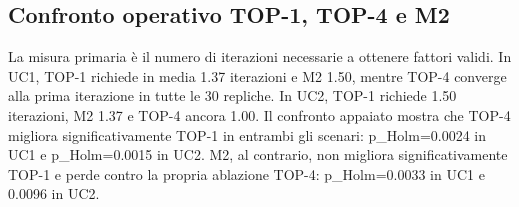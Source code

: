 \subsection{Confronto operativo TOP-1, TOP-4 e M2}\label{sec:finale_5_1_2}\label{sec:confronto}

La misura primaria è il numero di iterazioni necessarie a ottenere fattori validi. In UC1, TOP-1 richiede in media 1.37 iterazioni e M2 1.50, mentre TOP-4 converge alla prima iterazione in tutte le 30 repliche. In UC2, TOP-1 richiede 1.50 iterazioni, M2 1.37 e TOP-4 ancora 1.00. Il confronto appaiato mostra che TOP-4 migliora significativamente TOP-1 in entrambi gli scenari: p\_Holm=0.0024 in UC1 e p\_Holm=0.0015 in UC2. M2, al contrario, non migliora significativamente TOP-1 e perde contro la propria ablazione TOP-4: p\_Holm=0.0033 in UC1 e 0.0096 in UC2.

